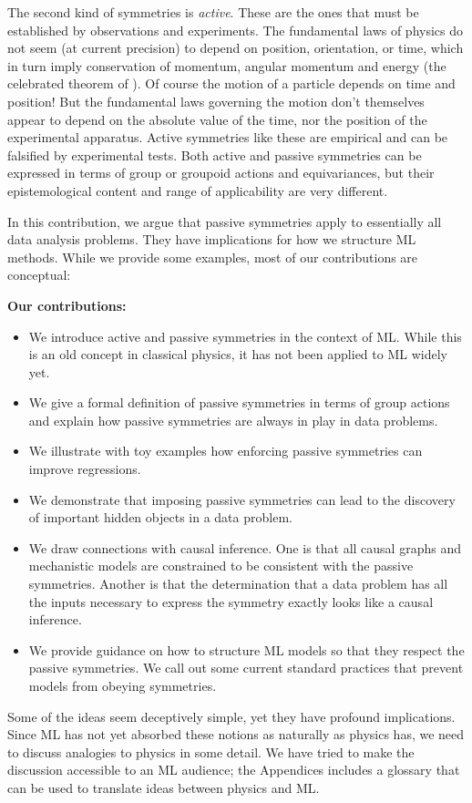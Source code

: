 \documentclass{article}
\theoremstyle{plain}
\theoremstyle{definition}
\theoremstyle{remark}
\begin{document}
The second kind of symmetries is {\em active}.
These are the ones that must be established by observations and experiments.
The fundamental laws of physics do not seem (at current precision) to depend on position, orientation, or time, which in turn imply conservation of momentum, angular momentum and energy (the celebrated theorem of \citealt{noether}).
Of course the motion of a particle depends on time and position! But the fundamental laws governing the motion don't themselves appear to depend on the absolute value of the time, nor the position of the experimental apparatus.
Active symmetries like these are empirical and can be falsified by experimental tests.
Both active and passive symmetries can be expressed in terms of group or groupoid actions and equivariances, but their epistemological content and range of applicability are very different. 

In this contribution, we argue that passive symmetries apply to essentially all data analysis problems.
They have implications for how we structure ML methods. While we provide some examples, most of our contributions are conceptual:

\textbf{Our contributions:}
\vspace{-1ex}\begin{itemize}
\parskip
\topsep 0pt
\partopsep 0pt
\parskip 0pt
\item
We introduce active and passive symmetries in the context of ML. While this is an old concept in classical physics, it has not been applied to ML widely yet.
\item
We give a formal definition of passive symmetries in terms of group actions and explain how passive symmetries are always in play in data problems.
\item
We illustrate with toy examples how enforcing passive symmetries can improve regressions. 
\item
We demonstrate that imposing passive symmetries can lead to the discovery of important hidden objects in a data problem.
\item
We draw connections with causal inference.
One is that all causal graphs and mechanistic models are constrained to be consistent with the passive symmetries.
Another is that the determination that a data problem has all the inputs necessary to express the symmetry exactly looks like a causal inference.
\item 
We provide guidance on how to structure ML models so that they respect the passive symmetries. We call out some current standard practices that prevent models from obeying symmetries. 
\end{itemize}\vspace{-1ex}
Some of the ideas seem deceptively simple, yet they have profound implications. Since ML has not yet absorbed these notions as naturally as physics has, we need to discuss analogies to physics in some detail. We have tried to make the discussion accessible to an ML audience; the Appendices includes a glossary that can be used to translate ideas between physics and ML.
\end{document}
